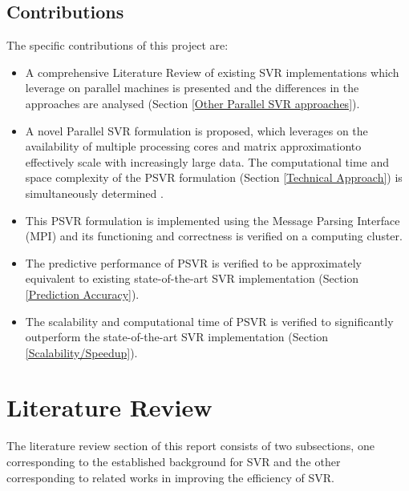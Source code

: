 \documentclass[12pt]{article}
\begin{document}
\subsection{Contributions}
The specific contributions of this project are:
\begin{itemize}
\item A comprehensive Literature Review of existing SVR implementations which leverage on parallel machines is presented and the differences in the approaches are analysed (Section \ref{Other Parallel SVR approaches}).
\item A novel Parallel SVR formulation is proposed, which leverages on the availability of multiple processing cores and matrix approximation\footnotemark to effectively scale with increasingly large data. The computational time and space complexity of the PSVR formulation (Section \ref{Technical Approach}) is simultaneously  determined .
\item This PSVR formulation is implemented using the Message Parsing Interface (MPI) and its functioning and correctness is verified on a computing cluster.
\item The predictive performance of PSVR is verified to be approximately equivalent to existing state-of-the-art SVR implementation (Section \ref{Prediction Accuracy}).
\item The scalability and computational time of PSVR is verified to significantly outperform the state-of-the-art SVR implementation (Section \ref{Scalability/Speedup}).
\end{itemize}

\cleardoublepage
\section{Literature Review}
The literature review section of this report consists of two subsections, one corresponding to the established background for SVR and the other corresponding to related works in improving the efficiency of SVR.
\end{document}

